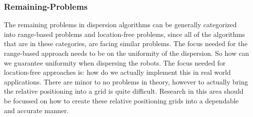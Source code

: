 \subsubsection{Remaining-Problems}
  The remaining problems in dispersion algorithms can be generally categorized into range-based problems and location-free problems, since all of the algorithms that are in these categories, are facing similar problems.
  The focus needed for the range-based approach needs to be on the uniformity of the dispersion. So how can we guarantee uniformity when dispersing the robots.
  The focus needed for location-free approaches is: how do we actually implement this in real world applications. There are minor to no problems in theory, however to actually bring the relative positioning into a grid is quite difficult. Research in this area should be focussed on how to create these relative positioning grids into a dependable and accurate manner.